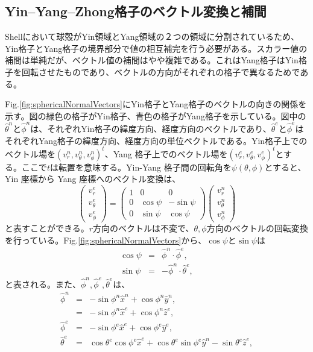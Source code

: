 \documentclass[12pt]{jsarticle}
\begin{document}
\subsection{Yin--Yang--Zhong格子のベクトル変換と補間}
Shellにおいて球殻がYin領域とYang領域の２つの領域に分割されているため、Yin格子とYang格子の境界部分で値の相互補完を行う必要がある。スカラー値の補間は単純だが、ベクトル値の補間はやや複雑である。これはYang格子はYin格子を回転させたものであり、ベクトルの方向がそれぞれの格子で異なるためである。

Fig.\ref{fig:sphericalNormalVectors}にYin格子とYang格子のベクトルの向きの関係を示す。図の緑色の格子がYin格子、青色の格子がYang格子を示している。図中の$\hat{\theta}^{n}$と$\hat{\phi}^{n}$は、それぞれYin格子の緯度方向、経度方向のベクトルであり、$\hat{\theta}^{e}$と$\hat{\phi}^{e}$はそれぞれYang格子の緯度方向、経度方向の単位ベクトルである。Yin格子上でのベクトル場を${(v^n_r,v^n_\theta,v^n_\phi)}^t$、Yang 格子上でのベクトル場を${(v^e_r,v^e_\theta,v^e_\phi)}^t$とする。ここで$t$は転置を意味する。Yin-Yang 格子間の回転角を$\psi(\theta,\phi)$とすると、Yin 座標から Yang 座標へのベクトル変換は、
\begin{equation}
\begin{pmatrix}
v^e_r \\ v^e_\theta \\ v^e_\phi  
\end{pmatrix} 
=
\begin{pmatrix}
1 & 0 & 0 \\ 0 & \cos\psi & -\sin\psi \\ 0 & \sin\psi & \cos\psi
\end{pmatrix} 
\begin{pmatrix}
v^n_r \\ v^n_\theta \\ v^n_\phi  
\end{pmatrix} 
\end{equation}
と表すことができる。$r$方向のベクトルは不変で、$\theta,\phi$方向のベクトルの回転変換を行っている。Fig.\ref{fig:sphericalNormalVectors}から、$\cos\psi$と$\sin\psi$は
\begin{eqnarray}
\cos\psi&=&\hat{\phi}^n \cdot \hat{\phi}^e, \\
\sin\psi&=&-\hat{\phi}^n \cdot \hat{\theta}^e ,
\end{eqnarray}
と表される。また、$\hat{\phi}^n,\hat{\phi}^e,\hat{\theta}^e$は、
\begin{eqnarray}
\hat{\phi}^n&=&-\sin\phi^n\hat{x}^n+\cos\phi^n\hat{y}^n, \\
&=&-\sin\phi^n\hat{x}^e+\cos\phi^n\hat{z}^e, \\
\hat{\phi}^e&=&-\sin\phi^e\hat{x}^e+\cos\phi^e\hat{y}^e, \\
\hat{\theta}^e&=&\cos\theta^e\cos\phi^e\hat{x}^e+\cos\theta^e\sin\phi^e\hat{y}^n-\sin\theta^e\hat{z}^e, 
\end{eqnarray}
\end{document}
